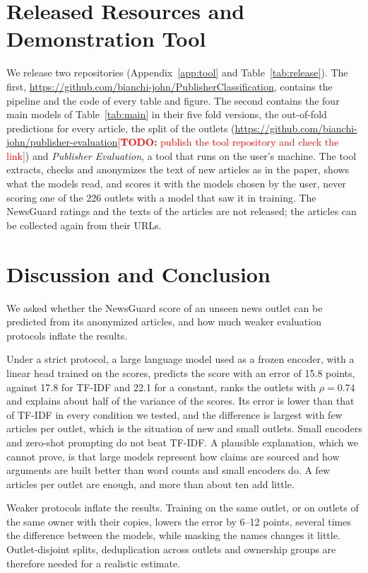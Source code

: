 \documentclass[11pt,a4paper]{article}
\newcommand{\todo}[1]{\textcolor{red}{[\textbf{TODO:} #1]}}
\begin{document}
\section{Released Resources and Demonstration Tool}\label{sec:tool}
We release two repositories (Appendix~\ref{app:tool} and Table~\ref{tab:release}). The first,
\url{https://github.com/bianchi-john/PublisherClassification}, contains the pipeline and the code of every table and
figure. The second contains the four main models of
Table~\ref{tab:main} in their five fold versions, the out-of-fold predictions for every article, the split of the
outlets (\url{https://github.com/bianchi-john/publisher-evaluation}\todo{publish the tool repository and check the link})
and \emph{Publisher Evaluation}, a tool that runs on the user's machine. The tool extracts, checks and anonymizes the
text of new articles as in the paper, shows what the models read, and scores it with the models chosen by the user,
never scoring one of the 226 outlets with a model that saw it in training. The NewsGuard ratings and the texts of the
articles are not released; the articles can be collected again from their URLs.

\section{Discussion and Conclusion}\label{sec:conclusion}
We asked whether the NewsGuard score of an unseen news outlet can be predicted from its anonymized articles, and how
much weaker evaluation protocols inflate the results.

Under a strict protocol, a large language model used as a frozen encoder, with a linear head trained on the scores,
predicts the score with an error of 15.8 points, against 17.8 for TF-IDF and 22.1 for a constant, ranks the outlets with
$\rho = 0.74$ and explains about half of the variance of the scores. Its error is lower than that of TF-IDF in every
condition we tested, and the difference is largest with few articles per outlet, which is the situation of new and
small outlets. Small encoders and zero-shot prompting do not beat TF-IDF. A plausible explanation, which we cannot
prove, is that large models represent how claims are sourced and how arguments are built better than word counts and
small encoders do. A few articles per outlet are enough, and more than about ten add little.

Weaker protocols inflate the results. Training on the same outlet, or on outlets of the same owner with their copies,
lowers the error by 6--12 points, several times the difference between the models, while masking the names changes it
little. Outlet-disjoint splits, deduplication across outlets and ownership groups are therefore needed for a realistic
estimate.
\end{document}
